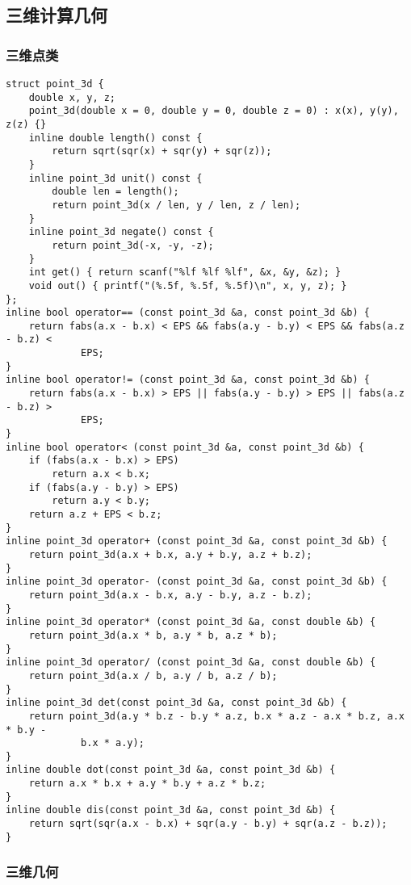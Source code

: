 \documentclass{article}
\begin{document}
\subsection{三维计算几何}

\subsubsection{三维点类}

\begin{lstlisting}
struct point_3d {
    double x, y, z;
    point_3d(double x = 0, double y = 0, double z = 0) : x(x), y(y), z(z) {}
    inline double length() const {
        return sqrt(sqr(x) + sqr(y) + sqr(z));
    }
    inline point_3d unit() const {
        double len = length();
        return point_3d(x / len, y / len, z / len);
    }
    inline point_3d negate() const {
        return point_3d(-x, -y, -z);
    }
    int get() { return scanf("%lf %lf %lf", &x, &y, &z); }
    void out() { printf("(%.5f, %.5f, %.5f)\n", x, y, z); }
};
inline bool operator== (const point_3d &a, const point_3d &b) {
    return fabs(a.x - b.x) < EPS && fabs(a.y - b.y) < EPS && fabs(a.z - b.z) <
             EPS;
}
inline bool operator!= (const point_3d &a, const point_3d &b) {
    return fabs(a.x - b.x) > EPS || fabs(a.y - b.y) > EPS || fabs(a.z - b.z) >
             EPS;
}
inline bool operator< (const point_3d &a, const point_3d &b) {
    if (fabs(a.x - b.x) > EPS)
        return a.x < b.x;
    if (fabs(a.y - b.y) > EPS)
        return a.y < b.y;
    return a.z + EPS < b.z;
}
inline point_3d operator+ (const point_3d &a, const point_3d &b) {
    return point_3d(a.x + b.x, a.y + b.y, a.z + b.z);
}
inline point_3d operator- (const point_3d &a, const point_3d &b) {
    return point_3d(a.x - b.x, a.y - b.y, a.z - b.z);
}
inline point_3d operator* (const point_3d &a, const double &b) {
    return point_3d(a.x * b, a.y * b, a.z * b);
}
inline point_3d operator/ (const point_3d &a, const double &b) {
    return point_3d(a.x / b, a.y / b, a.z / b);
}
inline point_3d det(const point_3d &a, const point_3d &b) {
    return point_3d(a.y * b.z - b.y * a.z, b.x * a.z - a.x * b.z, a.x * b.y -
             b.x * a.y);
}
inline double dot(const point_3d &a, const point_3d &b) {
    return a.x * b.x + a.y * b.y + a.z * b.z;
}
inline double dis(const point_3d &a, const point_3d &b) {
    return sqrt(sqr(a.x - b.x) + sqr(a.y - b.y) + sqr(a.z - b.z));
}
\end{lstlisting}

\subsubsection{三维几何}
\end{document}
